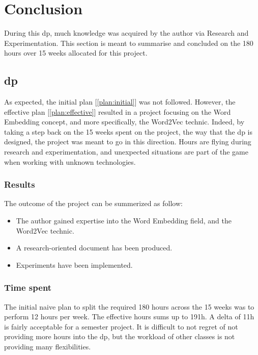 \chapter{Conclusion}
\label{chap:conclusion}
During this \gls{dp}, much knowledge was acquired by the author via Research and Experimentation. This section is meant to summarise and concluded on the 180 hours over 15 weeks allocated for this project.

\section{\gls{dp}}
As expected, the initial plan [\ref{plan:initial}] was not followed. However, the effective plan [\ref{plan:effective}] resulted in a project focusing on the Word Embedding concept, and more specifically, the Word2Vec technic. Indeed, by taking a step back on the 15 weeks spent on the project, the way that the \gls{dp} is designed, the project was meant to go in this direction. Hours are flying during research and experimentation, and unexpected situations are part of the game when working with unknown technologies.

\subsection{Results}
The outcome of the project can be summerized as follow:

\begin{itemize}
\setlength\itemsep{0em}
    \item The author gained expertise into the Word Embedding field, and the Word2Vec technic.
    \item A research-oriented document has been produced.
    \item Experiments have been implemented.
\end{itemize}


\subsection{Time spent}
The initial naive plan to split the required 180 hours across the 15 weeks was to perform 12 hours per week. The effective hours sums up to 191h. A delta of 11h is fairly acceptable for a semester project. It is difficult to not regret of not providing more hours into the \gls{dp}, but the workload of other classes is not providing many flexibilities.

